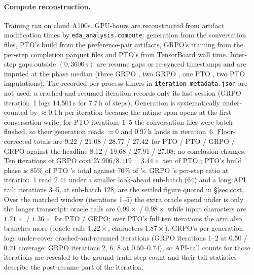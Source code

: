 \paragraph{Compute reconstruction.} Training ran on cloud A100s. GPU-hours are reconstructed from
artifact modification times by \texttt{eda\_analysis.compute}: generation from the conversation
files, PTO's build from the preference-pair artifacts, GRPO's training from the per-step
completion parquet files and PTO's from TensorBoard wall time. Inter-step gaps outside
$(0, 3600\,\mathrm{s})$ are resume gaps or re-synced timestamps and are imputed at the phase
median (three GRPO \Kz{}, two GRPO \Kf{}, one PTO \Kz{}, two PTO \Kf{} imputations). The recorded
per-process timers in \texttt{iteration\_metadata.json} are not used: a crashed-and-resumed
iteration records only its last session (GRPO \Kf{} iteration~1 logs 14{,}501\,s for 7.7\,h of
steps). Generation is systematically under-counted by ${\approx}0.1$\,h per iteration because the
mtime span opens at the first conversation write; for PTO \Kf{} iterations 1--5 the conversation
files were batch-flushed, so their generation reads ${\approx}0$ and $0.97$\,h lands in iteration~6.
Floor-corrected totals are $9.22$ / $21.08$ / $28.77$ / $27.42$\,\gpuh{} for PTO \Kz{} / PTO \Kf{}
/ GRPO \Kz{} / GRPO \Kf{} against the headline $8.12$ / $19.68$ / $27.91$ / $27.08$; no
conclusion changes. Ten iterations of GRPO \Kz{} cost $27.906/8.119 = 3.44\times$ ten of PTO
\Kz{}; PTO's build phase is $85\%$ of PTO \Kf{}'s total against $70\%$ of \Kz{}'s. GRPO \Kf{}'s
per-step ratio at iteration~1 read $2.41$ under a smaller look-ahead sub-batch (64) and a long
API tail; iterations 3--5, at sub-batch 128, are the settled figure quoted in \S\ref{sec:cost}.
Over the matched window (iterations 1--5) the extra oracle spend under \Kf{} is only the longer
transcript: oracle calls are $0.99\times$ / $0.98\times$ while input characters are
$1.21\times$ / $1.36\times$ for PTO / GRPO; over PTO's full ten iterations the \Kf{} arm also
branches more (oracle calls $1.22\times$, characters $1.87\times$). GRPO's per-generation logs under-cover crashed-and-resumed iterations (GRPO
\Kf{} iterations 1--2 at $0.50$ / $0.71$ coverage; GRPO \Kz{} iterations 2, 6, 8 at
$0.50$--$0.74$), so API-call counts for those iterations are rescaled to the ground-truth step count
and their tail statistics describe the post-resume part of the iteration.

